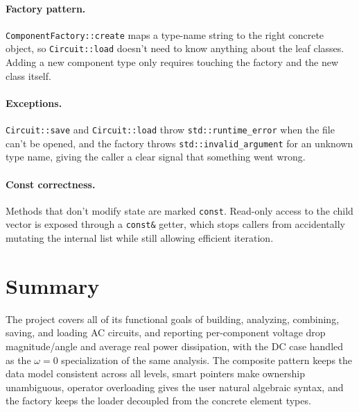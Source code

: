 \documentclass[11pt]{article}
\begin{document}
\paragraph{Factory pattern.}
\texttt{ComponentFactory::create} maps a type-name string to the right
concrete object, so \texttt{Circuit::load} doesn't need to know anything
about the leaf classes. Adding a new component type only requires touching
the factory and the new class itself.

\paragraph{Exceptions.}
\texttt{Circuit::save} and \texttt{Circuit::load} throw
\texttt{std::runtime\_error} when the file can't be opened, and the
factory throws \texttt{std::invalid\_argument} for an unknown type name,
giving the caller a clear signal that something went wrong.

\paragraph{Const correctness.}
Methods that don't modify state are marked \texttt{const}. Read-only
access to the child vector is exposed through a \texttt{const\&} getter,
which stops callers from accidentally mutating the internal list while
still allowing efficient iteration.

\section{Summary}

The project covers all of its functional goals of building, analyzing,
combining, saving, and loading AC circuits, and reporting per-component
voltage drop magnitude/angle and average real power dissipation, with the
DC case handled as the $\omega = 0$ specialization of the same analysis.
The composite pattern keeps the data model consistent across all levels,
smart pointers make ownership unambiguous, operator overloading gives the
user natural algebraic syntax, and the factory keeps the loader decoupled
from the concrete element types.
\end{document}
